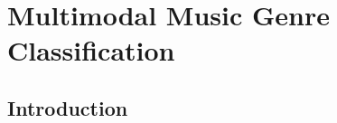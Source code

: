 
\chapter{Multimodal Music Genre Classification}
\label{sec:multimodal-class}

\section{Introduction}
\label{sec:multimodal-class:introduction}

